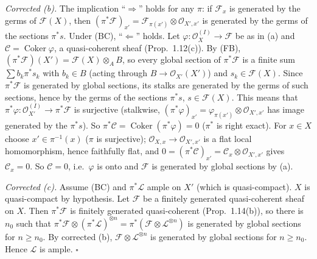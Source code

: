 \documentclass[11pt]{article}
\begin{document}
\emph{Corrected (b).} The implication ``$\Rightarrow$'' holds for any $\pi$: if $\mathcal{F}_x$ is generated by the germs of $\mathcal{F}(X)$, then $(\pi^*\mathcal{F})_{x'}=\mathcal{F}_{\pi(x')}\otimes\mathcal{O}_{X',x'}$ is generated by the germs of the sections $\pi^*s$. Under (BC), ``$\Leftarrow$'' holds. Let $\varphi:\mathcal{O}_X^{(I)}\to\mathcal{F}$ be as in (a) and $\mathcal{C}=\operatorname{Coker}\varphi$, a quasi-coherent sheaf (Prop.~1.12(c)). By (FB), $(\pi^*\mathcal{F})(X')=\mathcal{F}(X)\otimes_AB$, so every global section of $\pi^*\mathcal{F}$ is a finite sum $\sum b_k\pi^*s_k$ with $b_k\in B$ (acting through $B\to\mathcal{O}_{X'}(X')$) and $s_k\in\mathcal{F}(X)$. Since $\pi^*\mathcal{F}$ is generated by global sections, its stalks are generated by the germs of such sections, hence by the germs of the sections $\pi^*s$, $s\in\mathcal{F}(X)$. This means that $\pi^*\varphi:\mathcal{O}_{X'}^{(I)}\to\pi^*\mathcal{F}$ is surjective (stalkwise, $(\pi^*\varphi)_{x'}=\varphi_{\pi(x')}\otimes\mathcal{O}_{X',x'}$ has image generated by the $\pi^*s$). So $\pi^*\mathcal{C}=\operatorname{Coker}(\pi^*\varphi)=0$ ($\pi^*$ is right exact). For $x\in X$ choose $x'\in\pi^{-1}(x)$ ($\pi$ is surjective); $\mathcal{O}_{X,x}\to\mathcal{O}_{X',x'}$ is a flat local homomorphism, hence faithfully flat, and $0=(\pi^*\mathcal{C})_{x'}=\mathcal{C}_x\otimes\mathcal{O}_{X',x'}$ gives $\mathcal{C}_x=0$. So $\mathcal{C}=0$, i.e.\ $\varphi$ is onto and $\mathcal{F}$ is generated by global sections by (a).

\emph{Corrected (c).} Assume (BC) and $\pi^*\mathcal{L}$ ample on $X'$ (which is quasi-compact). $X$ is quasi-compact by hypothesis. Let $\mathcal{F}$ be a finitely generated quasi-coherent sheaf on $X$. Then $\pi^*\mathcal{F}$ is finitely generated quasi-coherent (Prop.~1.14(b)), so there is $n_0$ such that $\pi^*\mathcal{F}\otimes(\pi^*\mathcal{L})^{\otimes n}=\pi^*(\mathcal{F}\otimes\mathcal{L}^{\otimes n})$ is generated by global sections for $n\ge n_0$. By corrected (b), $\mathcal{F}\otimes\mathcal{L}^{\otimes n}$ is generated by global sections for $n\ge n_0$. Hence $\mathcal{L}$ is ample. \hfill$\square$
\end{document}
